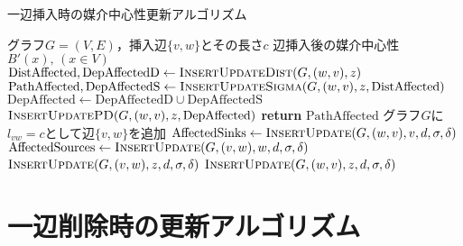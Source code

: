 \begin{algorithm}[H]
  \caption{一辺挿入時の媒介中心性更新アルゴリズム}
  \label{algo:update-bc-on-insert}
  \begin{algorithmic}[1]
    \Require グラフ$G=(V,E)$，挿入辺$\{v,w\}$とその長さ$c$
    \Ensure 辺挿入後の媒介中心性$B'(x),\,(x\in V)$
    \State $\mathrm{DistAffected},\mathrm{DepAffectedD}\gets\textproc{InsertUpdateDist}(G,(w,v),z)$
    \State $\mathrm{PathAffected},\mathrm{DepAffectedS}\gets\textproc{InsertUpdateSigma}(G,(w,v),z,\mathrm{DistAffected})$
    \State $\mathrm{DepAffected}\gets\mathrm{DepAffectedD}\cup\mathrm{DepAffectedS}$
    \State $\textproc{InsertUpdatePD}(G,(w,v),z,\mathrm{DepAffected})$
    \State \textbf{return} $\mathrm{PathAffected}$
    \EndProcedure
    \State グラフ$G$に$l_{vw}=c$として辺$\{v,w\}$を追加
    \State $\mathrm{AffectedSinks}\gets\textproc{InsertUpdate}(G,(w,v),v,d,\sigma,\delta)$
    \State $\mathrm{AffectedSources}\gets\textproc{InsertUpdate}(G,(v,w),w,d,\sigma,\delta)$
    \State $\textproc{InsertUpdate}(G,(v,w),z,d,\sigma,\delta)$
    \EndFor
    \State $\textproc{InsertUpdate}(G,(w,v),z,d,\sigma,\delta)$
    \EndFor
  \end{algorithmic}
\end{algorithm}

\section{一辺削除時の更新アルゴリズム}
\label{sect:algorithm-on-delete}

